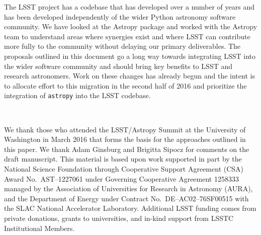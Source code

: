 \documentclass[]{spie}  %
\begin{document}
The LSST project has a codebase that has developed over a number of years and has been developed independently of the wider Python astronomy software community.
We have looked at the Astropy package and worked with the Astropy team to understand areas where synergies exist and where LSST can contribute more fully to the community without delaying our primary deliverables.
The proposals outlined in this document go a long way towards integrating LSST into the wider software community and should bring key benefits to LSST and research astronomers.
Work on these changes has already begun and the intent is to allocate effort to this migration in the second half of 2016 and prioritize the integration of \texttt{astropy} into the LSST codebase.

\acknowledgments\

We thank those who attended the LSST/Astropy Summit at the University of Washington in March 2016 that forms the basis for the approaches outlined in this paper.
We thank Adam Ginsburg and Brigitta Sipocz for comments on the draft manuscript.
This material is based upon work supported in part by the National Science Foundation through Cooperative Support Agreement (CSA) Award No.\ AST--1227061 under Governing Cooperative Agreement 1258333 managed by the Association of Universities for Research in Astronomy (AURA), and the Department of Energy under Contract No.\ DE--AC02--76SF00515 with the SLAC National Accelerator Laboratory.
Additional LSST funding comes from private donations, grants to universities, and in-kind support from LSSTC Institutional Members.

\end{document}
